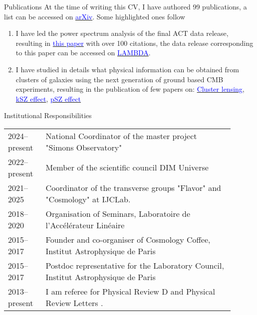 \documentclass{resume} %
\newcommand{\TIB}[1]{\textcolor{blue}{#1}}
\begin{document}
\begin{rSection}{Publications}
At the time of writing this CV, I have authored 99 publications, a list can be accessed on \href{https://arxiv.org/search/astro-ph?searchtype=author&query=Louis\%2C+T}{\TIB{arXiv}}. Some highlighted ones follow
\begin{enumerate}
\item I have led the power spectrum analysis of the final ACT data release, resulting in \href{https://arxiv.org/abs/2503.14452}{\TIB{this paper}} with over 100 citations, the data release corresponding to this paper can be accessed on \href{https://lambda.gsfc.nasa.gov/product/act/act_dr6.02/}{\TIB{LAMBDA}}.
\item I have studied in details what physical information can be obtained from clusters of galaxies using the next generation of ground based CMB experiments, resulting in the publication of few papers on: \href{https://ui.adsabs.harvard.edu/abs/2017PhRvD..95d3517L}{ \TIB{Cluster lensing}},  \href{https://ui.adsabs.harvard.edu/abs/2016PhRvD..94d3522A}{ \TIB{kSZ effect}}, \href{https://journals.aps.org/prd/abstract/10.1103/PhysRevD.96.123509}{\TIB{pSZ effect}} \\

\end{enumerate}

\newpage


\end{rSection}

\vspace{-0.6cm}


\begin{rSection}{Institutional Responsibilities}
\begin{table}[h]
{\def\arraystretch{1.5}\tabcolsep=0pt
\begin{tabular}{p{0.15\linewidth}p{0.75\linewidth}}
2024--present &   National Coordinator of the master project "Simons Observatory"   \\
2022--present &   Member of the scientific council DIM Universe  \\
2021--2025 &  Coordinator of the transverse groups "Flavor" and "Cosmology" at IJCLab. \\
2018--2020 &  Organisation of Seminars, Laboratoire de l'Accélérateur Linéaire  \\
2015--2017 &  Founder and co-organiser of Cosmology Coffee, Institut Astrophysique de Paris  \\
2015--2017 &  Postdoc representative for the Laboratory Council, Institut Astrophysique de Paris \\
2013--present &  I am referee for Physical Review D and Physical Review Letters .  
\end{tabular}%
}
\end{table}
\end{rSection}
\vspace{-0.6cm}
\end{document}
